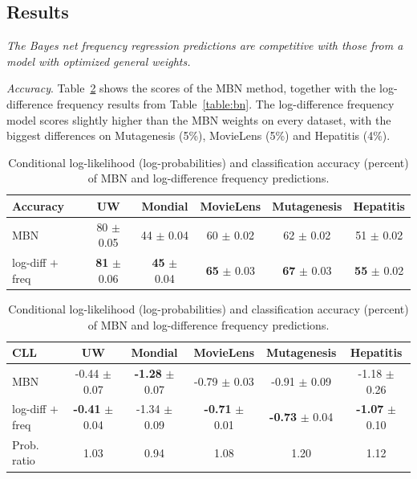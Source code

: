 \documentclass[twoside,11pt]{article}
\newcommand{\point}[1]{\noindent\emph{#1}.}
\newcommand{\keypoint}[1]{{\em #1}}
\begin{document}
\subsection{Results}

\keypoint{The Bayes net frequency regression predictions are competitive with those from a model with optimized general weights.}

\point{Accuracy} Table~\ref{table:mbn} shows the scores of the MBN method, together with the log-difference frequency results from Table~\ref{table:bn}. The log-difference frequency model scores slightly higher than the MBN weights on every dataset, with the biggest differences on Mutagenesis (5\%),  MovieLens (5\%) and Hepatitis (4\%). 

\begin{table}[thbp]

\caption{Conditional log-likelihood (log-probabilities) and classification accuracy (percent) of MBN and log-difference frequency predictions.}

\begin{center}

\begin{tabular}{|l|c|c|c|c|c|}
\hline
Accuracy& UW & Mondial & MovieLens & Mutagenesis & Hepatitis \\\hline
MBN & 80 $\pm$ 0.05 & 44 $\pm$ 0.04 & 60 $\pm$ 0.02 & 62 $\pm$ 0.02 & 51 $\pm$ 0.02 \\\hline
log-diff $+$ freq & \textbf{81} $\pm$ 0.06 & \textbf{45} $\pm$ 0.04 & \textbf{65} $\pm$ 0.03 & \textbf{67} $\pm$ 0.03 & \textbf{55} $\pm$ 0.02 \\
\hline
\end{tabular}
\end{center}


\begin{center}
\begin{tabular}{|l|c|c|c|c|c|}
\hline
CLL & UW & Mondial & MovieLens & Mutagenesis & Hepatitis \\\hline
MBN & -0.44 $\pm$ 0.07 & \textbf{-1.28} $\pm$ 0.07 & -0.79 $\pm$ 0.03 & -0.91 $\pm$ 0.09 & -1.18 $\pm$ 0.26 \\
log-diff $+$ freq & \textbf{-0.41} $\pm$ 0.04 & -1.34 $\pm$ 0.09 & \textbf{-0.71} $\pm$ 0.01 & \textbf{-0.73} $\pm$ 0.04 & \textbf{-1.07} $\pm$ 0.10 \\
Prob. ratio & 1.03 & 0.94 & 1.08 & 1.20 & 1.12\\
\hline
\end{tabular}
\end{center}
\label{table:mbn}

\end{table}%
\end{document}
